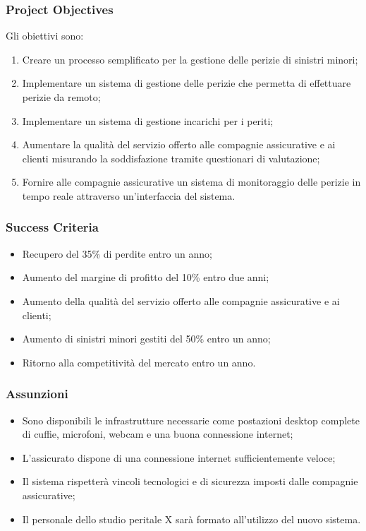 \documentclass[a4paper,12pt, openright]{report}
\begin{document}
\subsubsection{Project Objectives}
Gli obiettivi sono:
\begin{enumerate}
    \item Creare un processo semplificato per la gestione delle perizie di sinistri minori;
    \item Implementare un sistema di gestione delle perizie che permetta di effettuare perizie da remoto;
    \item Implementare un sistema di gestione incarichi per i periti;
    \item Aumentare la qualità del servizio offerto alle compagnie assicurative e ai clienti misurando la soddisfazione tramite questionari di valutazione;
    \item Fornire alle compagnie assicurative un sistema di monitoraggio delle perizie in tempo reale attraverso un'interfaccia del sistema.
\end{enumerate}

\subsubsection{Success Criteria}
\begin{itemize}
    \item Recupero del 35\% di perdite entro un anno;
    \item Aumento del margine di profitto del 10\% entro due anni;
    \item Aumento della qualità del servizio offerto alle compagnie assicurative e ai clienti;
    \item Aumento di sinistri minori gestiti del 50\% entro un anno;
    \item Ritorno alla competitività del mercato entro un anno.
\end{itemize}


\subsubsection{Assunzioni}
\begin{itemize}
    \item Sono disponibili le infrastrutture necessarie come postazioni desktop complete di cuffie, microfoni, webcam e una buona connessione internet;
    \item L'assicurato dispone di una connessione internet sufficientemente veloce;
    \item Il sistema rispetterà vincoli tecnologici e di sicurezza imposti dalle compagnie assicurative;
    \item Il personale dello studio peritale X sarà formato all'utilizzo del nuovo sistema.
\end{itemize} 
\end{document}
